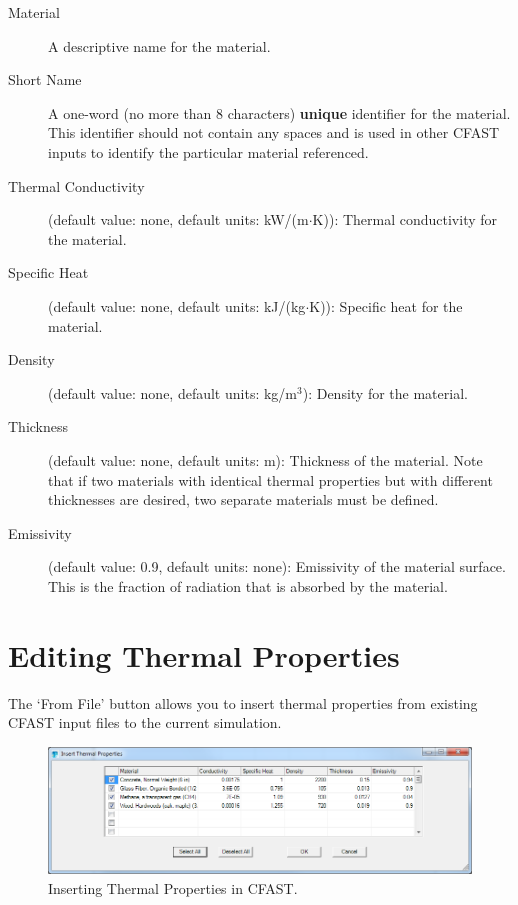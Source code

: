 \begin{description}
\item[Material] A descriptive name for the material.

\item[Short Name] A one-word (no more than 8 characters) \textbf{unique} identifier for the material.  This identifier should not contain any spaces and is used in other CFAST inputs to identify the particular material referenced.

\item[Thermal Conductivity] (default value: none, default units: kW/(m$\cdot$K)): Thermal conductivity for the material.

\item[Specific Heat] (default value: none, default units: kJ/(kg$\cdot$K)): Specific heat for the material.

\item[Density] (default value: none, default units: kg/m$^3$): Density for the material.

\item[Thickness] (default value: none, default units: m): Thickness of the material.  Note that if two materials with identical thermal properties but with different thicknesses are desired, two separate materials must be defined.

\item[Emissivity] (default value: 0.9, default units: none): Emissivity of the material surface.  This is the fraction of radiation that is absorbed by the material.
\end{description}

\section{Editing Thermal Properties}

The `From File' button allows you to insert thermal properties from existing CFAST input files to the current simulation.

\begin{figure}[h!]
\begin{center}
\includegraphics[width=6.5in]{FIGURES/Insert_Thermal_Properties}
\caption[Inserting Thermal Properties in CFAST]{Inserting Thermal Properties in CFAST.}
\end{center}
\end{figure}




